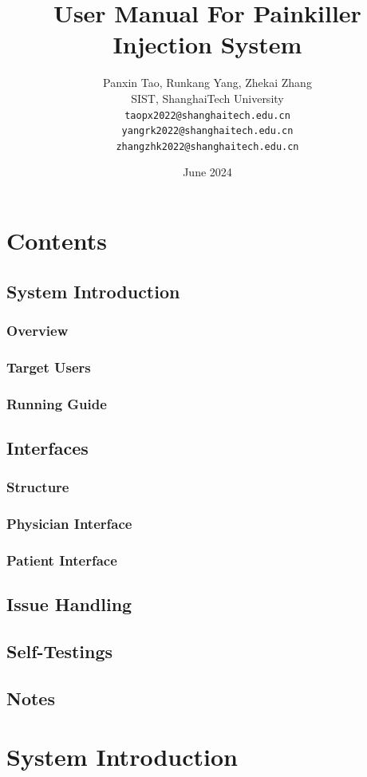 \documentclass{article}
\title{\heiti User Manual For Painkiller Injection System}
\author{%
  Panxin Tao, Runkang Yang, Zhekai Zhang\\
  SIST, ShanghaiTech University\\
  \texttt{taopx2022@shanghaitech.edu.cn}\\
  \texttt{yangrk2022@shanghaitech.edu.cn}\\
  \texttt{zhangzhk2022@shanghaitech.edu.cn}\\
}
\date{June 2024}
\begin{document}
\maketitle
\newpage
\section{Contents}
\subsection{System Introduction}
\subsubsection{Overview}
\subsubsection{Target Users}
\subsubsection{Running Guide}
\subsection{Interfaces}
\subsubsection{Structure}
\subsubsection{Physician Interface}
\subsubsection{Patient Interface}
\subsection{Issue Handling}
\subsection{Self-Testings}
\subsection{Notes}

\newpage
\section{System Introduction}
\end{document}
